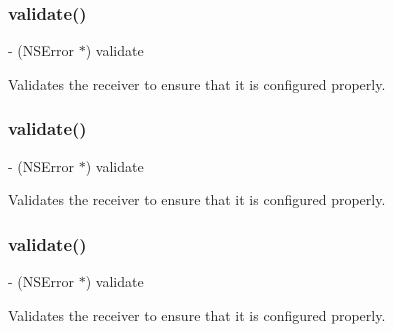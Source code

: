 \subsubsection{\texorpdfstring{validate()}{validate()}\hspace{0.1cm}{\footnotesize\ttfamily [2/5]}}
{\footnotesize\ttfamily -\/ (N\+S\+Error $\ast$) validate \begin{DoxyParamCaption}{ }\end{DoxyParamCaption}}

Validates the receiver to ensure that it is configured properly. \mbox{\label{interfaceFBDialogsParams_a627baaa7e2e59c95e7d99b31e659c9b4}} 
\subsubsection{\texorpdfstring{validate()}{validate()}\hspace{0.1cm}{\footnotesize\ttfamily [3/5]}}
{\footnotesize\ttfamily -\/ (N\+S\+Error $\ast$) validate \begin{DoxyParamCaption}{ }\end{DoxyParamCaption}}

Validates the receiver to ensure that it is configured properly. \mbox{\label{interfaceFBDialogsParams_a627baaa7e2e59c95e7d99b31e659c9b4}} 
\subsubsection{\texorpdfstring{validate()}{validate()}\hspace{0.1cm}{\footnotesize\ttfamily [4/5]}}
{\footnotesize\ttfamily -\/ (N\+S\+Error $\ast$) validate \begin{DoxyParamCaption}{ }\end{DoxyParamCaption}}

Validates the receiver to ensure that it is configured properly. \mbox{\label{interfaceFBDialogsParams_a627baaa7e2e59c95e7d99b31e659c9b4}} 
